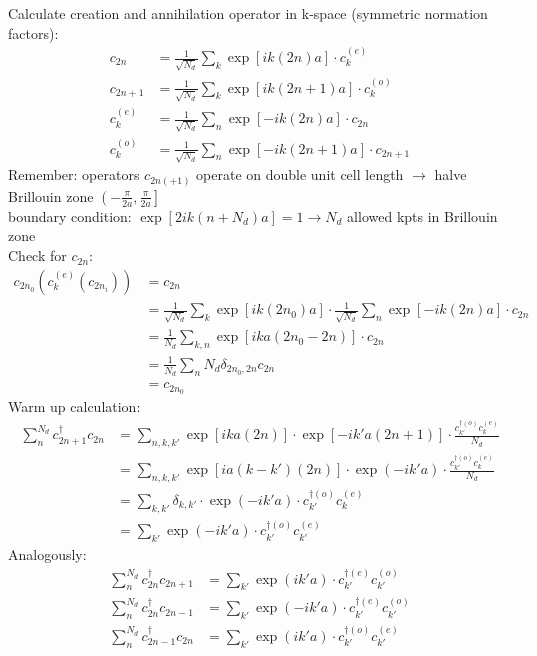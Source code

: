 Calculate creation and annihilation operator in k-space (symmetric normation factors):
\begin{align}
	c_{2n} &= \frac{1}{\sqrt{N_d}}\sum_k\exp\left[ik\left(2n\right)a\right]\cdot c_{k}^{(e)}\\
	c_{2n+1} &= \frac{1}{\sqrt{N_d}}\sum_k\exp\left[ik\left(2n+1\right)a\right]\cdot c_{k}^{(o)}\\
	c_k^{(e)} &= \frac{1}{\sqrt{N_d}}\sum_n \exp\left[-ik\left(2n\right)a\right]\cdot c_{2n}\\
	c_k^{(o)} &= \frac{1}{\sqrt{N_d}}\sum_n \exp\left[-ik\left(2n+1\right)a\right]\cdot c_{2n+1}
\end{align}
Remember: operators $c_{2n(+1)}$ operate on double unit cell length $\rightarrow$ halve Brillouin zone $\left(-\frac{\pi}{2a}, \frac{\pi}{2a}\right]$\\
boundary condition: $\exp\left[2ik\left(n+N_d\right)a\right] = 1 \rightarrow N_d$ allowed kpts in Brillouin zone\\
Check for $c_{2n}$:
\begin{align}
	c_{2n_0}(c_k^{(e)}(c_{2n_i})) &= c_{2n} \\
	&= \frac{1}{\sqrt{N_d}}\sum_k\exp\left[ik\left(2n_0\right)a\right]\cdot \frac{1}{\sqrt{N_d}}\sum_n \exp\left[-ik\left(2n\right)a\right]\cdot c_{2n}\\
	&= \frac{1}{N_d}\sum_{k, n} \exp\left[ika\left(2n_0-2n\right)\right]\cdot c_{2n}\\
	&= \frac{1}{N_d}\sum_n N_d \delta_{2n_0,2n} c_{2n}\\
	&= c_{2n_0}
\end{align}
Warm up calculation:
\begin{align}
	\sum_n^{N_d}c_{2n+1}^\dagger c_{2n} &=\sum_{n, k, k'} \exp\left[ika(2n)\right] \cdot \exp\left[-ik'a(2n+1)\right] \cdot \frac{c_{k'}^{\dagger(o)}c_k^{(e)}}{N_d} \\
	&=\sum_{n, k, k'} \exp\left[ia(k-k')(2n)\right] \cdot \exp\left(-ik'a\right) \cdot  \frac{c_{k'}^{\dagger(o)}c_k^{(e)}}{N_d} \\
	&=\sum_{k, k'} \delta_{k, k'} \cdot \exp\left(-ik'a\right)\cdot c_{k'}^{\dagger(o)}c_k^{(e)}\\
	&=\sum_{k'} \exp\left(-ik'a\right) \cdot c_{k'}^{\dagger(o)}c_{k'}^{(e)}
\end{align}
Analogously:
\begin{align}
	\sum_n^{N_d} c_{2n}^\dagger c_{2n+1} &=\sum_{k'} \exp\left(ik'a\right)\cdot c_{k'}^{\dagger(e)}c_{k'}^{(o)}\\
	\sum_n^{N_d} c_{2n}^\dagger c_{2n-1}&=\sum_{k'} \exp\left(-ik'a\right)\cdot  c_{k'}^{\dagger(e)}c_{k'}^{(o)}\\
	\sum_n^{N_d} c_{2n-1}^\dagger c_{2n} &=\sum_{k'} \exp\left(ik'a\right)\cdot  c_{k'}^{\dagger(o)}c_{k'}^{(e)}
\end{align}
